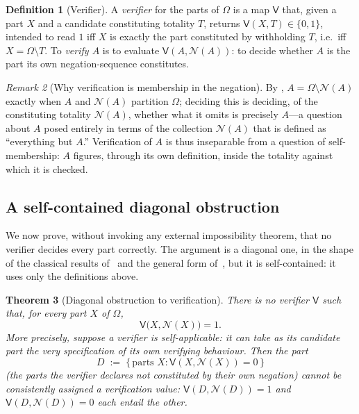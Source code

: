 \documentclass[11pt,a4paper]{article}
\theoremstyle{thmstyle}
\newtheorem{theorem}{Theorem}[section]
\theoremstyle{definition}
\newtheorem{definition}[theorem]{Definition}
\theoremstyle{remark}
\newtheorem{remark}[theorem]{Remark}
\newcommand{\Space}{\Omega}
\newcommand{\Neg}{\mathcal{N}}
\newcommand{\Ver}{\mathsf{V}}
\begin{document}
\begin{definition}[Verifier]
\label{def:verifier}
A \emph{verifier} for the parts of $\Space$ is a map $\Ver$ that, given a part
$X$ and a candidate constituting totality $T$, returns $\Ver(X,T)\in\{0,1\}$,
intended to read $1$ iff $X$ is exactly the part constituted by withholding $T$,
i.e.\ iff $X=\Space\setminus T$. To \emph{verify $A$} is to evaluate
$\Ver(A,\Neg(A))$: to decide whether $A$ is the part its own negation-sequence
constitutes.
\end{definition}

\begin{remark}[Why verification is membership in the negation]
\label{rem:ver-membership}
By , $A=\Space\setminus\Neg(A)$ exactly when $A$ and $\Neg(A)$
partition $\Space$; deciding this is deciding, of the constituting totality
$\Neg(A)$, whether what it omits is precisely $A$---a question about $A$ posed
entirely in terms of the collection $\Neg(A)$ that is defined as
``everything but $A$.'' Verification of $A$ is thus inseparable from a question
of self-membership: $A$ figures, through its own definition, inside the totality
against which it is checked.
\end{remark}

\subsection{A self-contained diagonal obstruction}

We now prove, without invoking any external impossibility theorem, that no
verifier decides every part correctly. The argument is a diagonal one, in the
shape of the classical results of~\citet{russell1903,cantor1891,tarski1936} and
the general form of~\citet{lawvere1969}, but it is self-contained: it uses only
the definitions above.

\begin{theorem}[Diagonal obstruction to verification]
\label{thm:diagonal}
There is no verifier $\Ver$ such that, for every part $X$ of $\Space$,
\[
\Ver\bigl(X,\Neg(X)\bigr)=1 .
\]
More precisely, suppose a verifier is \emph{self-applicable}: it can take as its
candidate part the very specification of its own verifying behaviour. Then the
part
\[
D\;:=\;\bigl\{\,\text{parts } X : \Ver(X,\Neg(X))=0\,\bigr\}
\]
\textup{(}the parts the verifier declares not constituted by their own
negation\textup{)} cannot be consistently assigned a verification value:
$\Ver(D,\Neg(D))=1$ and $\Ver(D,\Neg(D))=0$ each entail the other.
\end{theorem}
\end{document}
